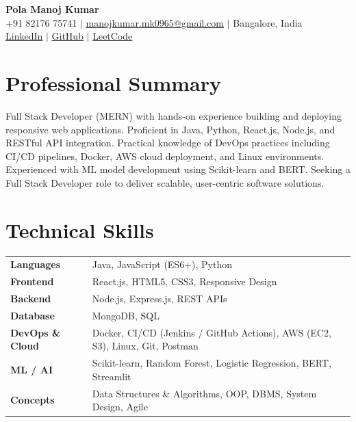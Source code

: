 \documentclass[10pt, a4paper]{article}
\begin{document}

\begin{center}
  {\LARGE\bfseries\color{accent} Pola Manoj Kumar}\\[4pt]
  \small
  +91 82176 75741 \;$|$\;
  \href{mailto:manojkumar.mk0965@gmail.com}{manojkumar.mk0965@gmail.com} \;$|$\;
  Bangalore, India \\[2pt]
  \href{https://www.linkedin.com/in/pola-manoj-kumar-30b528306}{LinkedIn}
  \;$|$\;
  \href{https://github.com/manojkumar675}{GitHub}
  \;$|$\;
  \href{https://leetcode.com/u/ManojKumar675/}{LeetCode}
\end{center}

\vspace{-4pt}

\section{Professional Summary}
Full Stack Developer (MERN) with hands-on experience building and deploying responsive
web applications. Proficient in Java, Python, React.js, Node.js, and RESTful API integration.
Practical knowledge of DevOps practices including CI/CD pipelines, Docker, AWS cloud
deployment, and Linux environments. Experienced with ML model development using
Scikit-learn and BERT. Seeking a Full Stack Developer role to deliver scalable,
user-centric software solutions.

\section{Technical Skills}
\begin{tabularx}{\linewidth}{@{} >{\bfseries}l X @{}}
  Languages       & Java, JavaScript (ES6+), Python \\[2pt]
  Frontend        & React.js, HTML5, CSS3, Responsive Design \\[2pt]
  Backend         & Node.js, Express.js, REST APIs \\[2pt]
  Database        & MongoDB, SQL \\[2pt]
  DevOps \& Cloud & Docker, CI/CD (Jenkins / GitHub Actions), AWS (EC2, S3), Linux, Git, Postman \\[2pt]
  ML / AI         & Scikit-learn, Random Forest, Logistic Regression, BERT, Streamlit \\[2pt]
  Concepts        & Data Structures \& Algorithms, OOP, DBMS, System Design, Agile \\
\end{tabularx}
\end{document}
